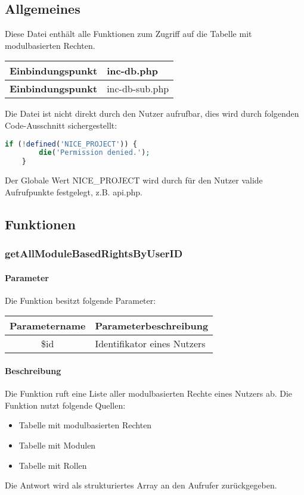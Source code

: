 \subsection{Allgemeines} Diese Datei enthält alle Funktionen zum Zugriff auf die Tabelle mit modulbasierten Rechten.
\begin{table}[H]
	\begin{tabular}{|c|p{11cm}|}
		\hline
		\textbf{Einbindungspunkt} & inc-db.php \\ \hline
		\textbf{Einbindungspunkt} & inc-db-sub.php \\ \hline
	\end{tabular}
\end{table}
Die Datei ist nicht direkt durch den Nutzer aufrufbar, dies wird durch folgenden Code-Ausschnitt sichergestellt:
\begin{lstlisting}[language=php]
	if (!defined('NICE_PROJECT')) {
		die('Permission denied.');
	}
\end{lstlisting}
Der Globale Wert {\glqq NICE\_PROJECT\grqq} wird durch für den Nutzer valide Aufrufpunkte festgelegt, z.B. {\glqq api.php\grqq}.
\newpage
\subsection{Funktionen}
\subsubsection{getAllModuleBasedRightsByUserID}
\paragraph{Parameter} Die Funktion besitzt folgende Parameter:
\begin{table}[H]
	\begin{tabular}{|c|p{11cm}|}
		\hline
		\textbf{Parametername} & \textbf{Parameterbeschreibung} \\ \hline
		\$id & Identifikator eines Nutzers \\ \hline
	\end{tabular}
\end{table}
\paragraph{Beschreibung} Die Funktion ruft eine Liste aller modulbasierten Rechte eines Nutzers ab. Die Funktion nutzt folgende Quellen:
\begin{itemize}
	\item Tabelle mit modulbasierten Rechten
	\item Tabelle mit Modulen
	\item Tabelle mit Rollen
\end{itemize}
Die Antwort wird als strukturiertes Array an den Aufrufer zurückgegeben.
